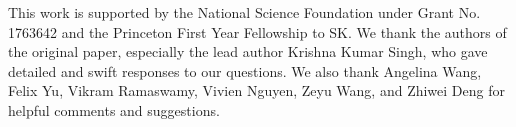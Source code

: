 

\clearpage









This work is supported by the National Science Foundation under Grant No. 1763642 and the Princeton First Year Fellowship to SK. 
We thank the authors of the original paper, especially the lead author Krishna Kumar Singh, who gave detailed and swift responses to our questions. We also thank Angelina Wang, Felix Yu, Vikram Ramaswamy, Vivien Nguyen, Zeyu Wang, and Zhiwei Deng for helpful comments and suggestions.

{\small


}

\clearpage
